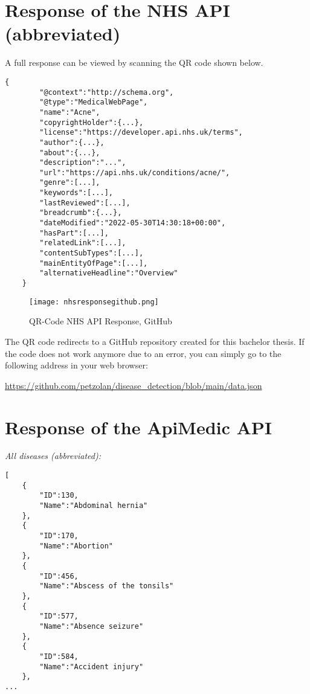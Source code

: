 \tocless\section{Response of the NHS API (abbreviated)}
A full response can be viewed by scanning the QR code shown below. 
\begin{lstlisting}[caption={Abbreviated Response of NHS API}]
	{
		"@context":"http://schema.org",
		"@type":"MedicalWebPage",
		"name":"Acne",
		"copyrightHolder":{...},
		"license":"https://developer.api.nhs.uk/terms",
		"author":{...},
		"about":{...},
		"description":"...",
		"url":"https://api.nhs.uk/conditions/acne/",
		"genre":[...],
		"keywords":[...],
		"lastReviewed":[...],
		"breadcrumb":{...},
		"dateModified":"2022-05-30T14:30:18+00:00",
		"hasPart":[...],
		"relatedLink":[...],
		"contentSubTypes":[...],
		"mainEntityOfPage":[...],
		"alternativeHeadline":"Overview"
	}
\end{lstlisting}
\begin{figure}[H]
	\centering
	\texttt{[image: nhsresponsegithub.png]}
	\caption{QR-Code NHS API Response, GitHub}
\end{figure}
The QR code redirects to a GitHub repository created for this bachelor thesis. If the code does not work anymore due to an error, you can simply go to the following address in your web browser:
\begin{center}
	\url{https://github.com/petzolan/disease_detection/blob/main/data.json}
\end{center}
\pagebreak
\tocless\section{Response of the ApiMedic API}
\textit{All diseases (abbreviated):} 

\begin{lstlisting}[basicstyle=\tiny, caption={Abbreviated Reponse of all Diseases ApiMedic API}]
[
	{
		"ID":130,
		"Name":"Abdominal hernia"
	},
	{
		"ID":170,
		"Name":"Abortion"
	},
	{
		"ID":456,
		"Name":"Abscess of the tonsils"
	},
	{
		"ID":577,
		"Name":"Absence seizure"
	},
	{
		"ID":584,
		"Name":"Accident injury"
	},
...
\end{lstlisting}

